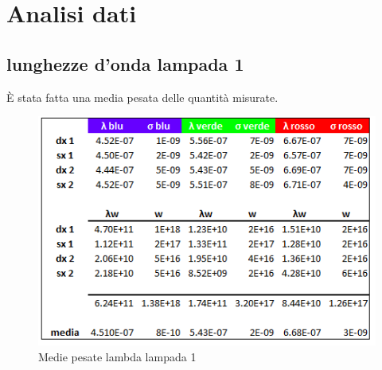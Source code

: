 \documentclass{article}
\begin{document}
\section{Analisi dati}

\subsection{lunghezze d'onda lampada 1}

È stata fatta una media pesata delle quantità misurate.

\begin{figure}[h!]
  \centering
  \includegraphics[width=0.6\linewidth]{IM tab_lambda_1}
  \caption{Medie pesate lambda lampada 1}
\end{figure}
\end{document}
